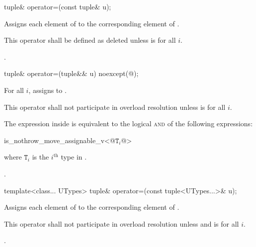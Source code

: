 %
\begin{itemdecl}
tuple& operator=(const tuple& u);
\end{itemdecl}

\begin{itemdescr}
\pnum
\effects Assigns each element of  to the corresponding
element of .

\pnum
\remarks This operator shall be defined as deleted unless
 is  for all $i$.

\pnum
\returns {}.
\end{itemdescr}

%
\begin{itemdecl}
tuple& operator=(tuple&& u) noexcept(@\seebelow@);
\end{itemdecl}

\begin{itemdescr}
\pnum
\effects For all $i$, assigns  to
.

\pnum
\remarks This operator shall not participate in overload resolution unless
 is  for all $i$.

\pnum
\remarks The expression inside  is equivalent to the logical \textsc{and} of the
following expressions:

\begin{codeblock}
is_nothrow_move_assignable_v<@$\mathtt{T}_i$@>
\end{codeblock}
where $\mathtt{T}_i$ is the $i^\text{th}$ type in .

\pnum
\returns {}.
\end{itemdescr}

%
\begin{itemdecl}
template<class... UTypes> tuple& operator=(const tuple<UTypes...>& u);
\end{itemdecl}

\begin{itemdescr}
\pnum
\effects Assigns each element of  to the corresponding element
of .

\pnum
\remarks This operator shall not participate in overload resolution unless
 and
 is  for all $i$.

\pnum
\returns {}.
\end{itemdescr}

